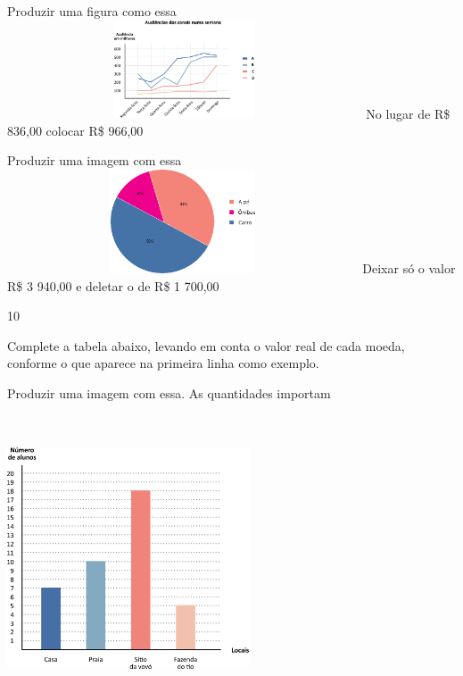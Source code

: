 \begin{escolha}
\begin{escolha}

\item
  Produzir uma figura como essa
\includegraphics[width=4.14203in,height=1.14177in]{media/image77.png}
No lugar de R\$ 836,00 colocar R\$ 966,00


\item
  Produzir uma imagem com essa
\includegraphics[width=4.10036in,height=1.20844in]{media/image78.png}
Deixar só o valor R\$ 3 940,00 e deletar o de R\$ 1 700,00
\end{escolha}


\num{10}

Complete a tabela abaixo, levando em conta o valor real de cada moeda,
conforme o que aparece na primeira linha como exemplo.

Produzir uma imagem com essa. As quantidades importam

\includegraphics[width=2.82051in,height=3.34367in]{media/image79.png}


\end{escolha}
